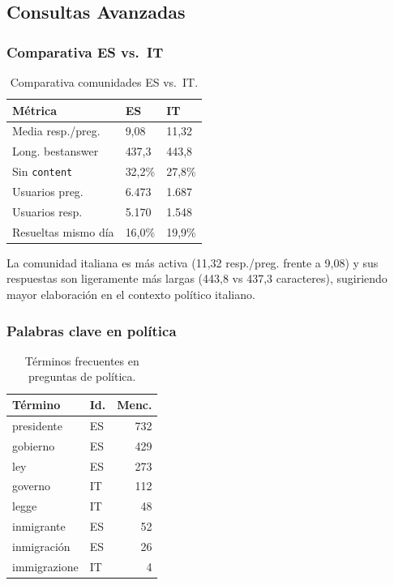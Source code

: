 \documentclass[10pt,twocolumn,a4paper]{article}
\begin{document}
\subsection{Consultas Avanzadas}

\subsubsection{Comparativa ES vs.\ IT}

\begin{table}[H]
\centering
\caption{Comparativa comunidades ES vs.\ IT.}
\label{tab:comparativa}
\begin{tabular}{p{2.4cm}ll}
\toprule
\textbf{M\'etrica} & \textbf{ES} & \textbf{IT} \\
\midrule
Media resp./preg.  & 9,08  & 11,32 \\
Long. bestanswer   & 437,3 & 443,8 \\
Sin \texttt{content} & 32,2\% & 27,8\% \\
Usuarios preg.     & 6.473 & 1.687 \\
Usuarios resp.     & 5.170 & 1.548 \\
Resueltas mismo d\'ia & 16,0\% & 19,9\% \\
\bottomrule
\end{tabular}
\end{table}

La comunidad italiana es m\'as activa (11,32 resp./preg. frente a 9,08)
y sus respuestas son ligeramente m\'as largas (443,8 vs 437,3 caracteres),
sugiriendo mayor elaboraci\'on en el contexto pol\'itico italiano.

\subsubsection{Palabras clave en pol\'itica}

\begin{table}[H]
\centering
\caption{T\'erminos frecuentes en preguntas de pol\'itica.}
\label{tab:keywords}
\begin{tabular}{llr}
\toprule
\textbf{T\'ermino} & \textbf{Id.} & \textbf{Menc.} \\
\midrule
presidente    & ES & 732 \\
gobierno      & ES & 429 \\
ley           & ES & 273 \\
governo       & IT & 112 \\
legge         & IT &  48 \\
inmigrante    & ES &  52 \\
inmigraci\'on & ES &  26 \\
immigrazione  & IT &   4 \\
\bottomrule
\end{tabular}
\end{table}
\end{document}
